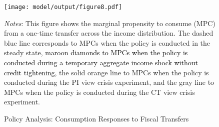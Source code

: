 \documentclass[12pt]{article}
\begin{document}
\begin{spacing}{1.5}
\begin{figure}[H]
\caption{Policy Analysis: Consumption Responses to Fiscal Transfers}
\label{fig: policy1}
\centering
\texttt{[image: model/output/figure8.pdf]} \\
\flushleft\raggedright{}\textit{\footnotesize{}Notes}{: \footnotesize{This figure shows the marginal propensity to consume (MPC) from a one-time transfer across the income distribution. The dashed blue line corresponds to MPCs when the policy is conducted in the steady state,  \textcolor{black}{ maroon diamonds to MPCs when the policy is conducted during a temporary aggregate income shock without credit tightening,}  the solid orange line to MPCs when the policy is conducted during the PI view crisis experiment, and the gray line to MPCs when the policy is conducted during the CT view crisis experiment.}}{\footnotesize\par}
\end{figure}


\end{spacing}

\newpage
\end{document}
